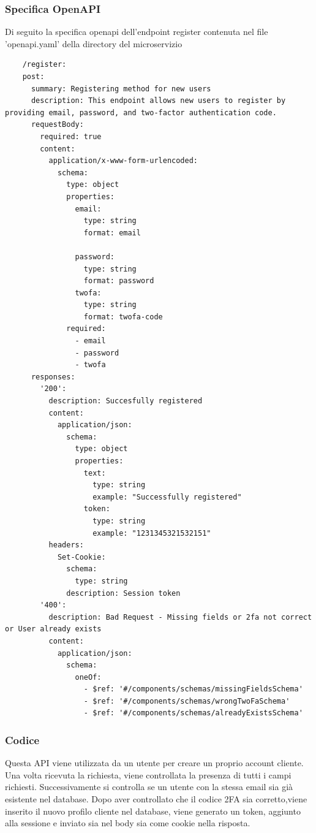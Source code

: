\documentclass{report}
\begin{document}
\subsubsection*{Specifica OpenAPI}
Di seguito la specifica openapi dell'endpoint register contenuta nel file 'openapi.yaml' della directory del microservizio
\begin{verbatim}
	/register:
    post:
      summary: Registering method for new users
      description: This endpoint allows new users to register by providing email, password, and two-factor authentication code.
      requestBody:
        required: true
        content:
          application/x-www-form-urlencoded:
            schema:
              type: object
              properties:
                email:
                  type: string
                  format: email
                  
                password:
                  type: string
                  format: password
                twofa:
                  type: string
                  format: twofa-code
              required:
                - email
                - password
                - twofa
      responses:
        '200':
          description: Succesfully registered
          content:
            application/json:
              schema:
                type: object
                properties:
                  text:
                    type: string
                    example: "Successfully registered"
                  token:
                    type: string
                    example: "1231345321532151"
          headers:
            Set-Cookie:
              schema:
                type: string
              description: Session token
        '400':
          description: Bad Request - Missing fields or 2fa not correct or User already exists
          content:
            application/json:
              schema:
                oneOf:
                  - $ref: '#/components/schemas/missingFieldsSchema'
                  - $ref: '#/components/schemas/wrongTwoFaSchema'
                  - $ref: '#/components/schemas/alreadyExistsSchema'

\end{verbatim}

\subsubsection*{Codice}
Questa API viene utilizzata da un utente per creare un proprio account cliente.
Una volta ricevuta la richiesta, viene controllata la presenza di tutti i campi richiesti.
Successivamente si controlla se un utente con la stessa email sia già esistente nel database.
Dopo aver controllato che il codice 2FA sia corretto,viene inserito il nuovo profilo cliente nel database, viene generato un token, aggiunto alla sessione e inviato sia nel body sia come cookie nella risposta.
\end{document}
